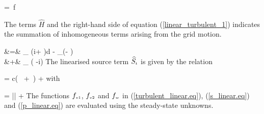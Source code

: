 %
\beq
   = \widehat{\rho\upsilon}\,f
  \label{turbulent_linear.eq}
\eeq
%

 The terms $\widehat{H}$ and the right-hand side of equation (\ref{linear_turbulent_1})
 indicates the summation of inhomogeneous terms arising from the grid motion.

%
\beq
  &=& \int_{} \left(i\omega\overline{\rho\upsilon}+
                           \right)d - 
                       \oint_{}\left(-
                       \right) \cdot
  \nonumber\\
 &+& \oint_{}
  \overline{\rho\upsilon}\left(\vec{\Omega}\times{}
                    -i\omega{}\right)
  \cdot {}
 \label{linear_turbulent_4}
\eeq
%
The linearised source term $\widehat{S}_{\mbox{\tiny $t$}}$ is given by the relation

%
\beq
   =
  c\left(
  \,\widehat{\rho\upsilon} +
  \,\overline{\rho\upsilon}\right)
  +
 \label{s_linear.eq}
\eeq
%
 with

%
\beq
   =  \left|\nabl \times {}\right| +
 \label{p_linear.eq}
\eeq
%
 The functions $f_{\mbox{\tiny $v1$}}$, $f_{\mbox{\tiny $v2$}}$ and $f_{\mbox{\tiny $w$}}$ in
 (\ref{turbulent_linear.eq}), (\ref{s_linear.eq}) and
 (\ref{p_linear.eq}) are evaluated using the steady-state unknowns.
